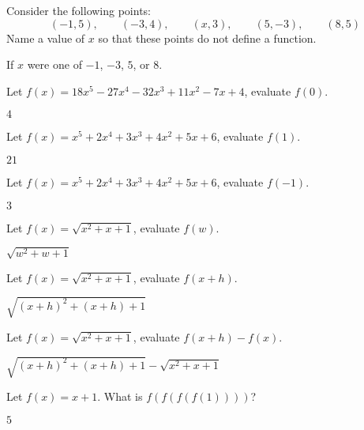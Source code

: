 \begin{exercises}
\begin{exercise} Consider the following points:
\[
(-1,5),\qquad (-3,4), \qquad(x,3), \qquad(5,-3), \qquad(8,5)
\]
Name a value of $x$ so that these points do not define a function. 
\begin{answer}
If $x$ were one of $-1$, $-3$, $5$, or $8$.
\end{answer}
\end{exercise}

\begin{exercise} Let $f(x) = 18x^5-27x^4-32x^3+11x^2 -7x +4$, evaluate $f(0)$.
\begin{answer}
$4$
\end{answer}
\end{exercise}

\begin{exercise} Let $f(x) = x^5+2x^4+3x^3+4x^2+5x+6$, evaluate $f(1)$.
\begin{answer}
$21$
\end{answer}
\end{exercise}

\begin{exercise} Let $f(x) = x^5+2x^4+3x^3+4x^2+5x+6$, evaluate $f(-1)$.
\begin{answer}
$3$
\end{answer}
\end{exercise}

\begin{exercise} Let $f(x) =\sqrt{x^2+x+1}$, evaluate $f(w)$.
\begin{answer}
$\sqrt{w^2+w+1}$
\end{answer}
\end{exercise}

\begin{exercise} Let $f(x) =\sqrt{x^2+x+1}$, evaluate $f(x+h)$.
\begin{answer}
$\sqrt{(x+h)^2+(x+h)+1}$
\end{answer}
\end{exercise}

\begin{exercise} Let $f(x) = \sqrt{x^2+x+1}$, evaluate $f(x+h) - f(x)$.
\begin{answer}
$\sqrt{(x+h)^2+(x+h)+1} - \sqrt{x^2+x+1}$
\end{answer}
\end{exercise}

\begin{exercise} Let $f(x) = x+1$. What is $f(f(f(f(1))))$?
\begin{answer}
$5$
\end{answer}
\end{exercise}


\end{exercises}
